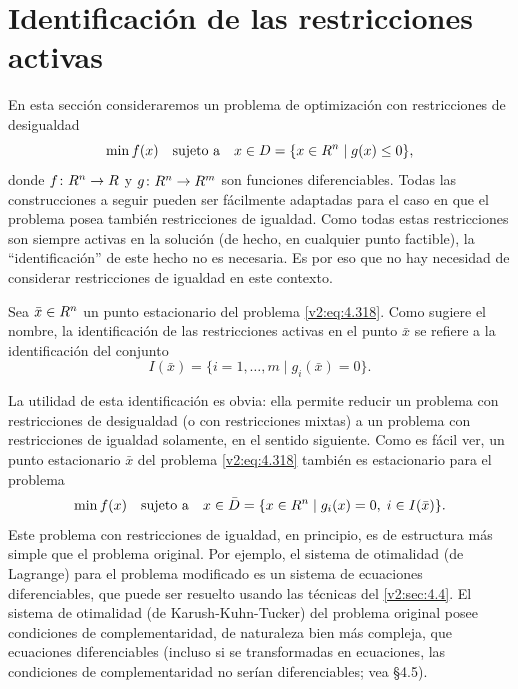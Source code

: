 
\section{Identificación de las restricciones activas}\label{v2:sec:4.7}

En esta sección consideraremos un problema de optimización con restricciones de desigualdad
\begin{equation}
    \min f(x) \quad \text{sujeto a} \quad x \in D = \{x \in R^n \mid g(x) \le 0\},
    \label{v2:eq:4.318}
\end{equation}
donde $f \colon R^n \to R$ y $g \colon R^n \to R^m$ son funciones diferenciables. Todas las construcciones a seguir pueden ser fácilmente adaptadas para el caso en que el problema posea también restricciones de igualdad. Como todas estas restricciones son siempre activas en la solución (de hecho, en cualquier punto factible), la ``identificación'' de este hecho no es necesaria. Es por eso que no hay necesidad de considerar restricciones de igualdad en este contexto.

Sea $\bar{x} \in R^n$ un punto estacionario del problema \eqref{v2:eq:4.318}. Como sugiere el nombre, la identificación de las restricciones activas en el punto $\bar{x}$ se refiere a la identificación del conjunto
\[
    I(\bar{x}) = \{i = 1, \dots, m \mid g_i(\bar{x}) = 0\}.
\]

La utilidad de esta identificación es obvia: ella permite reducir un problema con restricciones de desigualdad (o con restricciones mixtas) a un problema con restricciones de igualdad solamente, en el sentido siguiente. Como es fácil ver, un punto estacionario $\bar{x}$ del problema \eqref{v2:eq:4.318} también es estacionario para el problema
\[
    \min f(x) \quad \text{sujeto a} \quad x \in \bar{D} = \{x \in R^n \mid g_i(x) = 0, \; i \in I(\bar{x})\}.
\]
Este problema con restricciones de igualdad, en principio, es de estructura más simple que el problema original. Por ejemplo, el sistema de otimalidad (de Lagrange) para el problema modificado es un sistema de ecuaciones diferenciables, que puede ser resuelto usando las técnicas del \cref{v2:sec:4.4}. El sistema de otimalidad (de Karush-Kuhn-Tucker) del problema original posee condiciones de complementaridad, de naturaleza bien más compleja, que ecuaciones diferenciables (incluso si se transformadas en ecuaciones, las condiciones de complementaridad no serían diferenciables; vea \S 4.5).

